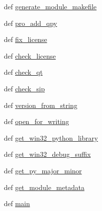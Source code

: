 \begin{DoxyCompactItemize}
\item 
def \hyperlink{namespacePyQt-x11-gpl-4_811_82_1_1configure-ng_ae9da499758452582fea25d49d8a96cb1}{generate\+\_\+module\+\_\+makefile}
\item 
def \hyperlink{namespacePyQt-x11-gpl-4_811_82_1_1configure-ng_a8c6e5b7f2178d9fe03272ab7f2d0ebda}{pro\+\_\+add\+\_\+qpy}
\item 
def \hyperlink{namespacePyQt-x11-gpl-4_811_82_1_1configure-ng_a19df9e1167a3059be792f8d1901b0339}{fix\+\_\+license}
\item 
def \hyperlink{namespacePyQt-x11-gpl-4_811_82_1_1configure-ng_a10dbb647a56b684779cd1cf6f14108ad}{check\+\_\+license}
\item 
def \hyperlink{namespacePyQt-x11-gpl-4_811_82_1_1configure-ng_a4b6f229e17a278e1b2417984a6ef58ab}{check\+\_\+qt}
\item 
def \hyperlink{namespacePyQt-x11-gpl-4_811_82_1_1configure-ng_abae7aaaa05557d85a730d402dbf9f3ef}{check\+\_\+sip}
\item 
def \hyperlink{namespacePyQt-x11-gpl-4_811_82_1_1configure-ng_a356ee268f49f589fe4b78748ae5479a6}{version\+\_\+from\+\_\+string}
\item 
def \hyperlink{namespacePyQt-x11-gpl-4_811_82_1_1configure-ng_a46bd27a7cfe6c7aec638a70612bb699a}{open\+\_\+for\+\_\+writing}
\item 
def \hyperlink{namespacePyQt-x11-gpl-4_811_82_1_1configure-ng_abee80a80441442874441254944d8abed}{get\+\_\+win32\+\_\+python\+\_\+library}
\item 
def \hyperlink{namespacePyQt-x11-gpl-4_811_82_1_1configure-ng_a490980f8b69c337ed67ebbbf4b3fb707}{get\+\_\+win32\+\_\+debug\+\_\+suffix}
\item 
def \hyperlink{namespacePyQt-x11-gpl-4_811_82_1_1configure-ng_aa4e56d2ed9e3ba98ead880f16c2f424d}{get\+\_\+py\+\_\+major\+\_\+minor}
\item 
def \hyperlink{namespacePyQt-x11-gpl-4_811_82_1_1configure-ng_ab0fcd50d5f218f23e6e5f4119672fa30}{get\+\_\+module\+\_\+metadata}
\item 
def \hyperlink{namespacePyQt-x11-gpl-4_811_82_1_1configure-ng_a8c5bddfef10b3ebd4468cd7d42346a65}{main}
\end{DoxyCompactItemize}
